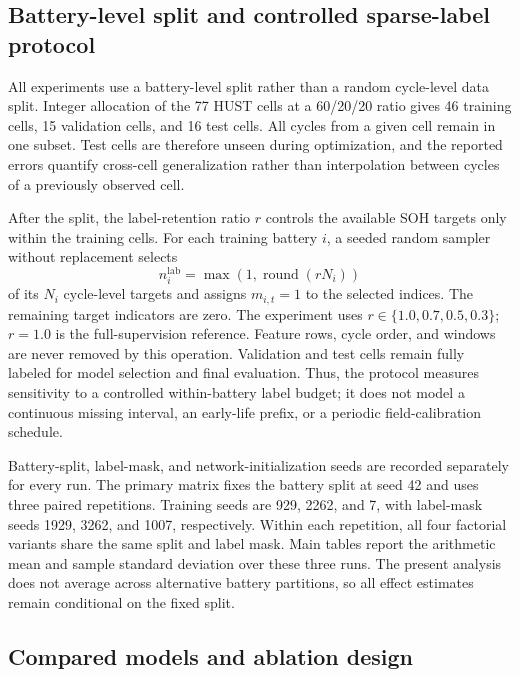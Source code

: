 \documentclass[pdflatex,sn-mathphys-num]{sn-jnl}
\begin{document}
\subsection{Battery-level split and controlled sparse-label protocol}
\label{subsec:split_protocol}

All experiments use a battery-level split rather than a random cycle-level data split. Integer allocation of the 77 HUST cells at a 60/20/20 ratio gives 46 training cells, 15 validation cells, and 16 test cells. All cycles from a given cell remain in one subset. Test cells are therefore unseen during optimization, and the reported errors quantify cross-cell generalization rather than interpolation between cycles of a previously observed cell.

After the split, the label-retention ratio $r$ controls the available SOH targets only within the training cells. For each training battery $i$, a seeded random sampler without replacement selects
\begin{equation}
  n_i^{\mathrm{lab}}=\max\left(1,\operatorname{round}(rN_i)\right)
\end{equation}
of its $N_i$ cycle-level targets and assigns $m_{i,t}=1$ to the selected indices. The remaining target indicators are zero. The experiment uses $r\in\{1.0,0.7,0.5,0.3\}$; $r=1.0$ is the full-supervision reference. Feature rows, cycle order, and windows are never removed by this operation. Validation and test cells remain fully labeled for model selection and final evaluation. Thus, the protocol measures sensitivity to a controlled within-battery label budget; it does not model a continuous missing interval, an early-life prefix, or a periodic field-calibration schedule.

Battery-split, label-mask, and network-initialization seeds are recorded separately for every run. The primary matrix fixes the battery split at seed 42 and uses three paired repetitions. Training seeds are 929, 2262, and 7, with label-mask seeds 1929, 3262, and 1007, respectively. Within each repetition, all four factorial variants share the same split and label mask. Main tables report the arithmetic mean and sample standard deviation over these three runs. The present analysis does not average across alternative battery partitions, so all effect estimates remain conditional on the fixed split.

\subsection{Compared models and ablation design}
\label{subsec:baselines}
\end{document}
